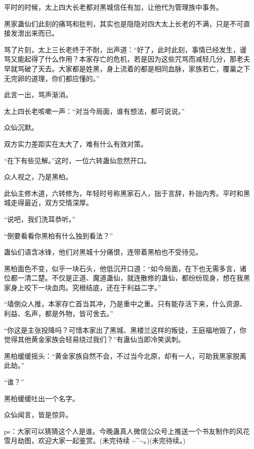 \begin{this_body}
平时的时候，太上四大长老都对黑城信任有加，让他代为管理族中事务。

黑家蛊仙们此刻的痛骂和批判，其实也是隐隐对四大太上长老的不满，只是不可直接发泄出来而已。

骂了片刻，太上三长老终于不耐，出声道：“好了，此时此刻，事情已经发生，谩骂又能起得了什么作用？本家存亡的危机，若是因为这些咒骂而减轻几分，那老夫早就骂破了天去。大家都是姓黑，身上流着的都是相同血脉，家族若亡，覆巢之下无完卵的道理，你们都应懂的。”

此言一出，骂声渐消。

太上四长老咳嗽一声：“对当今局面，谁有想法，都可说说。”

众仙沉默。

双方实力差距实在太大了，难有什么有效对策。

“在下有些见解。”这时，一位六转蛊仙忽然开口。

众人视之，乃是黑柏。

此仙主修木道，六转修为，年轻时号称黑家石人，拙于言辞，朴拙内秀。平时和黑城走得最近，双方交情深厚。

“说吧，我们洗耳恭听。”

“倒要看看你黑柏有什么独到看法？”

蛊仙们语含冰锋，他们对黑城十分痛恨，连带着黑柏也不受待见。

黑柏面色不变，似乎一块石头，他低沉开口道：“如今局面，在下也无需多言，诸位都一清二楚。不仅是正道、魔道蛊仙，就连散修的蛊仙，都纷纷现身，想在我黑家身上咬下一块血肉。究根结底，还在于利益二字。”

“墙倒众人推，本家存亡首当其冲，乃是重中之重。只有能存活下来，什么资源、利益、名声，都是外物，皆可舍去。”

“你这是主张投降吗？可惜本家出了黑城、黑楼兰这样的叛徒，王庭福地毁了，你觉得其他黄金家族会轻易绕过我们？”有蛊仙当即冷笑讽刺。

黑柏缓缓摇头：“黄金家族自然不会，不过当今北原，却有一人，可助我黑家脱离此劫。”

“谁？”

黑柏缓缓吐出一个名字。

众仙闻言，皆是惊异。

ps：大家可以猜猜这个人是谁。今晚蛊真人微信公众号上推送一个书友制作的风花雪月劫图，欢迎大家一起鉴赏。(未完待续 \~{}\^{}\~{}。)(未完待续。)

\end{this_body}


